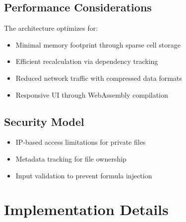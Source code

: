 \documentclass[10pt,a4paper]{article}  %
\begin{document}
\subsection{Performance Considerations}

The architecture optimizes for:
\begin{itemize}
    \item Minimal memory footprint through sparse cell storage
    \item Efficient recalculation via dependency tracking
    \item Reduced network traffic with compressed data formats
    \item Responsive UI through WebAssembly compilation
\end{itemize}

\subsection{Security Model}

\begin{itemize}
    \item IP-based access limitations for private files
    \item Metadata tracking for file ownership
    \item Input validation to prevent formula injection
\end{itemize}

\section{Implementation Details}
\end{document}
